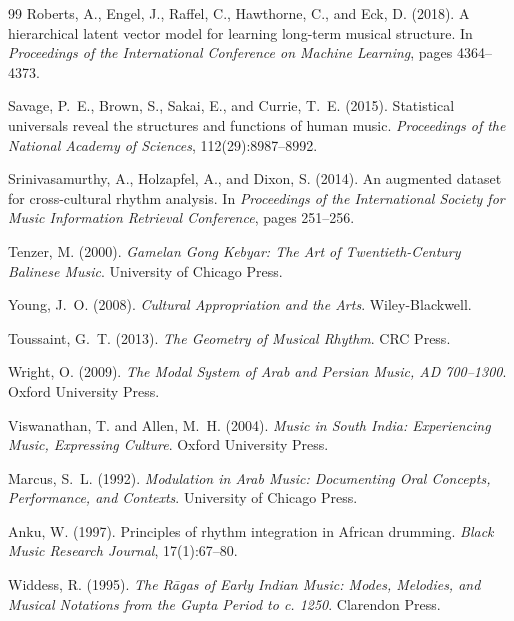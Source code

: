 \documentclass[cmj]{article}
\begin{document}
\begin{thebibliography}{99}
Roberts, A., Engel, J., Raffel, C., Hawthorne, C., and Eck, D. (2018).
\newblock A hierarchical latent vector model for learning long-term musical structure.
\newblock In \emph{Proceedings of the International Conference on Machine Learning}, pages 4364--4373.

Savage, P.~E., Brown, S., Sakai, E., and Currie, T.~E. (2015).
\newblock Statistical universals reveal the structures and functions of human music.
\newblock \emph{Proceedings of the National Academy of Sciences}, 112(29):8987--8992.

Srinivasamurthy, A., Holzapfel, A., and Dixon, S. (2014).
\newblock An augmented dataset for cross-cultural rhythm analysis.
\newblock In \emph{Proceedings of the International Society for Music Information Retrieval Conference}, pages 251--256.

Tenzer, M. (2000).
\newblock \emph{Gamelan Gong Kebyar: The Art of Twentieth-Century Balinese Music}.
\newblock University of Chicago Press.

Young, J.~O. (2008).
\newblock \emph{Cultural Appropriation and the Arts}.
\newblock Wiley-Blackwell.

Toussaint, G.~T. (2013).
\newblock \emph{The Geometry of Musical Rhythm}.
\newblock CRC Press.

Wright, O. (2009).
\newblock \emph{The Modal System of Arab and Persian Music, AD 700--1300}.
\newblock Oxford University Press.

Viswanathan, T. and Allen, M.~H. (2004).
\newblock \emph{Music in South India: Experiencing Music, Expressing Culture}.
\newblock Oxford University Press.

Marcus, S.~L. (1992).
\newblock \emph{Modulation in Arab Music: Documenting Oral Concepts, Performance, and Contexts}.
\newblock University of Chicago Press.

Anku, W. (1997).
\newblock Principles of rhythm integration in African drumming.
\newblock \emph{Black Music Research Journal}, 17(1):67--80.

Widdess, R. (1995).
\newblock \emph{The R\={a}gas of Early Indian Music: Modes, Melodies, and Musical Notations from the Gupta Period to c. 1250}.
\newblock Clarendon Press.

\end{thebibliography}
\end{document}
